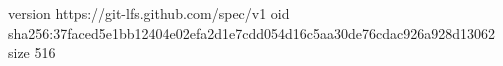 version https://git-lfs.github.com/spec/v1
oid sha256:37faced5e1bb12404e02efa2d1e7cdd054d16c5aa30de76cdac926a928d13062
size 516
